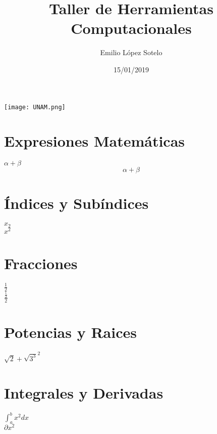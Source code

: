 \documentclass{article}
\title{\Huge Taller de Herramientas Computacionales}
\author{Emilio López Sotelo}
\date{15/01/2019}
\begin{document}
	\maketitle
		\begin{center}
		\texttt{[image: UNAM.png]}
		\end{center}
	\newpage
		\section*{Expresiones Matemáticas}
		$\alpha + \beta$
		\\
		\[\alpha + \beta\]
		\section*{Índices y Subíndices}
		$x_{2}$
		\\
		$x^{2}$
		\section*{Fracciones}
		$\frac{1}{2}$
		\\
		$\frac{\frac{1}{2}}{2}$
		\section*{Potencias y Raices}
		$\sqrt{2} + \sqrt{3^3}^{2}$
		\section*{Integrales y Derivadas}
		$\int_{a}^{b} x^{2}dx$
		\\
		$\partial x^{2}$
\end{document}
